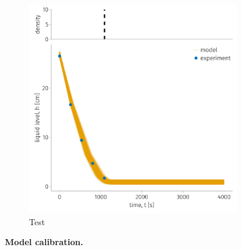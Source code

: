 \documentclass[openacc]{rsproca_new}%
\begin{document}
\begin{figure}[h!]
     \begin{subfigure}[b]{0.49\textwidth}
    	\includegraphics[width=\textwidth]{../test.pdf}
	\caption{Test} \label{fig:test}
    \end{subfigure}
    \caption{
      \textbf{Model calibration.}
      }
\end{figure}
\end{document}
